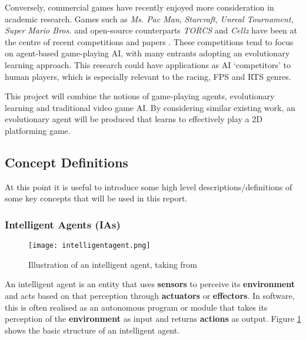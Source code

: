 Conversely, commercial games have recently enjoyed more consideration in academic research. Games such as \emph{Ms. Pac Man}, \emph{Starcraft}, \emph{Unreal Tournament}, \emph{Super Mario Bros.} and open-source counterparts \emph{TORCS} \cite{torcs} and \emph{Cellz} \cite{cellz} have been at the centre of recent competitions and papers \cite{panorama} \cite{marioaicomp}. These competitions tend to focus on agent-based game-playing AI, with many entrants adopting an evolutionary learning approach. This research could have applications as AI `competitors' to human players, which is especially relevant to the racing, FPS and RTS genres.

This project will combine the notions of game-playing agents, evolutionary learning and traditional video game AI. By considering similar existing work, an evolutionary agent will be produced that learns to effectively play a 2D platforming game.


\subsection{Concept Definitions}
\label{subsec:concepts}

At this point it is useful to introduce some high level descriptions/definitions of some key concepts that will be used in this report.

\subsubsection{Intelligent Agents (IAs)}

\begin{figure}[t]
	\centering
	\texttt{[image: intelligentagent.png]}
	\caption{Illustration of an intelligent agent, taking from \cite[p.~32]{modernai1}}
	\label{fig:ia}
\end{figure}

An intelligent agent is an entity that uses \textbf{sensors} to perceive its \textbf{environment} and acts based on that perception through \textbf{actuators} or \textbf{effectors}. In software, this is often realised as an autonomous program or module that takes its perception of the \textbf{environment} as input and returns \textbf{actions} as output. Figure \ref{fig:ia} shows the basic structure of an intelligent agent. \cite[p.~34]{modernai3}


